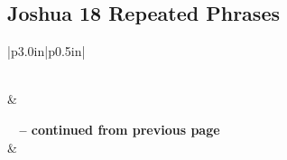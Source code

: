 \subsection{Joshua 18 Repeated Phrases}


\normalsize
 
\begin{center}
\begin{longtable}{|p{3.0in}|p{0.5in}|}
\caption[Joshua 18 Repeated Phrases]{Joshua 18 Repeated Phrases}\label{table:Repeated Phrases Joshua 18} \\
\hline {} &  \\ \hline 
\endfirsthead
 
{{\bfseries \tablename\ \thetable{} -- continued from previous page}} \\  
\hline {} &  \\ \hline 
\endhead
 

\end{longtable}
\end{center}
